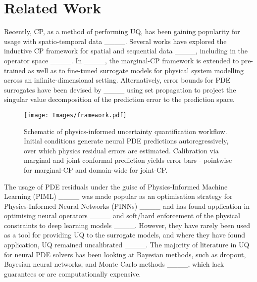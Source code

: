 \section{Related Work}
Recently, CP, as a method of performing UQ, has been gaining popularity for usage with spatio-temporal data ____. Several works have explored the inductive CP framework for spatial and sequential data ____, including in the operator space ____. In ____, the marginal-CP framework is extended to pre-trained as well as to fine-tuned surrogate models for physical system modelling across an infinite-dimensional setting. Alternatively, error bounds for PDE surrogates have been devised by ____ using set propagation to project the singular value decomposition of the prediction error to the prediction space. 

\begin{figure}[h!]
    \centering
    \texttt{[image: Images/framework.pdf]}
    \caption{Schematic of physics-informed uncertainty quantification workflow. Initial conditions generate neural PDE predictions autoregressively, over which physics residual errors are estimated. Calibration via marginal and joint conformal prediction yields error bars - pointwise for marginal-CP and domain-wide for joint-CP.}
    \label{fig: layout}
\end{figure}


The usage of PDE residuals under the guise of Physics-Informed Machine Learning (PIML) ____ was made popular as an optimisation strategy for Physics-Informed Neural Networks  (PINNs) ____ and has found application in optimising neural operators ____ and soft/hard enforcement of the physical constraints to deep learning models ____. However, they have rarely been used as a tool for providing UQ to the surrogate models, and where they have found application, UQ remained uncalibrated ____. The majority of literature in UQ for neural PDE solvers has been looking at Bayesian methods, such as dropout, Bayesian neural networks, and Monte Carlo methods ____, which lack guarantees or are computationally expensive.